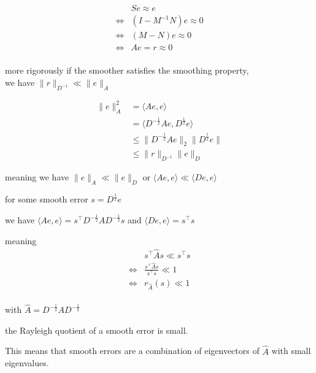 \documentclass{article}
\begin{document}
\begin{align*}
      & Se \approx  e \\ 
 \iff & \left(I - M^{-1}N\right)e \approx  0 \\ 
 \iff & \left(M - N\right)e \approx  0 \\ 
 \iff & Ae = r \approx  0 \\ 
\end{align*}

more rigorously if the smoother satisfies the smoothing property, \\ 
we have $\|r\|_{D^{-1}} \ll  \|e\|_{A}$


\begin{align*}
    \|e\|_{A}^{2} & = \langle Ae, e \rangle \\
                  & =  \langle D^{-\frac{1}{2}}Ae, D^{\frac{1}{2}}e \rangle \\
                  & \le \| D^{-\frac{1}{2}}Ae \|_{2} \| D^{\frac{1}{2}}e \| \\
                  & \le \| r \|_{D^{-1}} \| e \|_{D}
\end{align*}

meaning we have $ \|e\|_{A} \ll \|e\|_{D}$ or $\langle Ae,e \rangle \ll \langle De, e \rangle  $

for some smooth error $s = D^{\frac{1}{2}}e$

we have $ \langle Ae,e \rangle = s^{\top}D^{-\frac{1}{2}}AD^{-\frac{1}{2}}s $ and $\langle De, e \rangle = s^{\top}s $

meaning
\begin{align*}
      & s^{\top}\hat{A} s \ll  s^{\top}s \\ 
 \iff & \frac{s^{\top}\hat{A} s}{s^{\top}s} \ll 1 \\ 
 \iff & r_{\hat{A}}(s) \ll 1 \\ 
\end{align*}

with $\hat{A} = D^{-\frac{1}{2}}AD^{-\frac{1}{2}}$

the Rayleigh quotient of a smooth error is small.

This means that smooth errors are a combination of eigenvectors of $\hat{A}$ with small eigenvalues.

\end{document}
